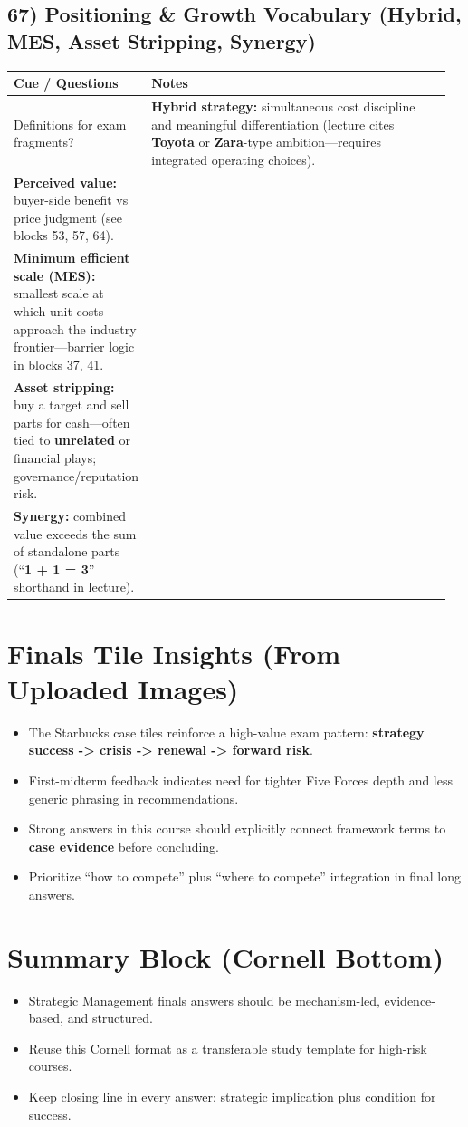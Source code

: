 \documentclass[10pt,a4paper]{article}
\newcommand{\cornell}[3]{
\subsection*{#1}
\begin{longtable}{|p{0.22\linewidth}|p{0.74\linewidth}|}
\hline
\rowcolor{soft}\textbf{Cue / Questions} & \textbf{Notes} \\
\hline
#2 & #3 \\
\hline
\end{longtable}
}
\begin{document}
\cornell{67) Positioning \& Growth Vocabulary (Hybrid, MES, Asset Stripping, Synergy)}
{Definitions for exam fragments?}
{
\textbf{Hybrid strategy:} simultaneous cost discipline and meaningful differentiation (lecture cites \textbf{Toyota} or \textbf{Zara}-type ambition---requires integrated operating choices).\\
\textbf{Perceived value:} buyer-side benefit vs price judgment (see blocks 53, 57, 64).\\
\textbf{Minimum efficient scale (MES):} smallest scale at which unit costs approach the industry frontier---barrier logic in blocks 37, 41.\\
\textbf{Asset stripping:} buy a target and sell parts for cash---often tied to \textbf{unrelated} or financial plays; governance/reputation risk.\\
\textbf{Synergy:} combined value exceeds the sum of standalone parts (``\textbf{1 + 1 = 3}'' shorthand in lecture).
}

\section*{Finals Tile Insights (From Uploaded Images)}
\begin{itemize}
  \item The Starbucks case tiles reinforce a high-value exam pattern: \textbf{strategy success -> crisis -> renewal -> forward risk}.
  \item First-midterm feedback indicates need for tighter Five Forces depth and less generic phrasing in recommendations.
  \item Strong answers in this course should explicitly connect framework terms to \textbf{case evidence} before concluding.
  \item Prioritize ``how to compete'' plus ``where to compete'' integration in final long answers.
\end{itemize}

\section*{Summary Block (Cornell Bottom)}
\begin{itemize}
  \item Strategic Management finals answers should be mechanism-led, evidence-based, and structured.
  \item Reuse this Cornell format as a transferable study template for high-risk courses.
  \item Keep closing line in every answer: strategic implication plus condition for success.
\end{itemize}
\end{document}
